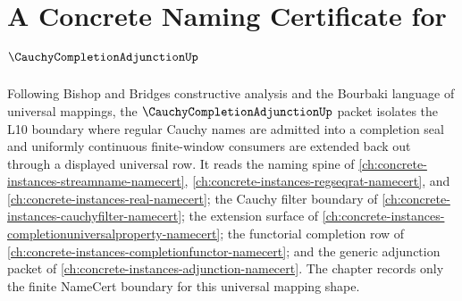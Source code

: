 \chapter{A Concrete Naming Certificate for $\CauchyCompletionAdjunctionUp$}
\label{ch:concrete-instances-cauchy-completion-adjunction-namecert}

Following Bishop and Bridges constructive analysis and the Bourbaki language of universal mappings, the $\CauchyCompletionAdjunctionUp$ packet isolates the L10 boundary where regular Cauchy names are admitted into a completion seal and uniformly continuous finite-window consumers are extended back out through a displayed universal row. It reads the naming spine of \autoref{ch:concrete-instances-streamname-namecert}, \autoref{ch:concrete-instances-regseqrat-namecert}, and \autoref{ch:concrete-instances-real-namecert}; the Cauchy filter boundary of \autoref{ch:concrete-instances-cauchyfilter-namecert}; the extension surface of \autoref{ch:concrete-instances-completionuniversalproperty-namecert}; the functorial completion row of \autoref{ch:concrete-instances-completionfunctor-namecert}; and the generic adjunction packet of \autoref{ch:concrete-instances-adjunction-namecert}. The chapter records only the finite NameCert boundary for this universal mapping shape.


